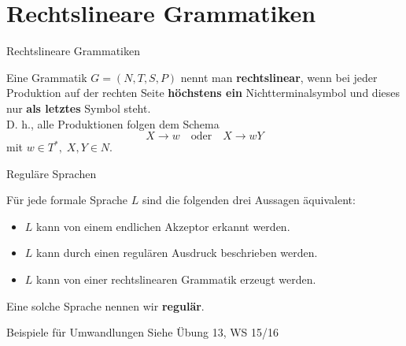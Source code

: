 
\section{Rechtslineare Grammatiken}
\begin{frame}{Rechtslineare Grammatiken}
	\begin{Definition}
		Eine Grammatik $G = (N, T, S, P)$ nennt man \textbf{rechtslinear}, wenn bei jeder Produktion auf der rechten Seite \textbf{höchstens ein} Nichtterminalsymbol und dieses nur \textbf{als letztes} Symbol steht.\\
		D. h., alle Produktionen folgen dem Schema $$X \to w \quad \text{oder} \quad X \to wY$$ mit $w \in T^*, \; X,Y \in N$.
	\end{Definition}
\end{frame}

\begin{frame}{Reguläre Sprachen}
	\begin{Satz}
		Für jede formale Sprache $L$ sind die folgenden drei Aussagen äquivalent:
		\begin{itemize}
			\item $L$ kann von einem endlichen Akzeptor erkannt werden.
			\item $L$ kann durch einen regulären Ausdruck beschrieben werden.
			\item $L$ kann von einer rechtslinearen Grammatik erzeugt werden.
		\end{itemize}
	\end{Satz}
	
	Eine solche Sprache nennen wir \textbf{regulär}.
\end{frame}

\begin{frame}{Beispiele für Umwandlungen}
	Siehe Übung 13, WS 15/16
\end{frame}

